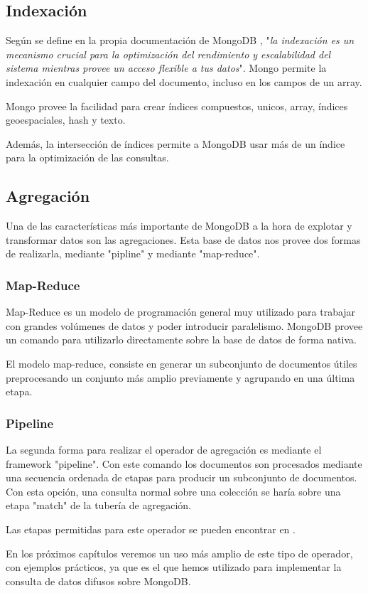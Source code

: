 \subsection{Indexación}

Según se define en la propia documentación de MongoDB \cite{mongodb}, "\textit{la indexación es un mecanismo crucial para la optimización del rendimiento y escalabilidad del sistema mientras provee un acceso flexible a tus datos}". Mongo permite la indexación en cualquier campo del documento, incluso en los campos de un array.

Mongo provee la facilidad para crear índices compuestos, unicos, array, índices geoespaciales, hash y texto.

Además, la intersección de índices permite a MongoDB usar más de un índice para la optimización de las consultas.

\subsection{Agregación}

Una de las características más importante de MongoDB a la hora de explotar y transformar datos son las agregaciones. Esta base de datos nos provee dos formas de realizarla, mediante "pipline" y mediante "map-reduce".

\subsubsection{Map-Reduce}

Map-Reduce es un modelo de programación general muy utilizado para trabajar con grandes volúmenes de datos y poder introducir paralelismo. MongoDB provee un comando para utilizarlo directamente sobre la base de datos de forma nativa.

El modelo map-reduce, consiste en generar un subconjunto de documentos útiles preprocesando un conjunto más amplio previamente y agrupando en una última etapa.

\subsubsection{Pipeline}

La segunda forma para realizar el operador de agregación es mediante el framework "pipeline". Con este comando los documentos son procesados mediante una secuencia ordenada de etapas para producir un subconjunto de documentos. Con esta opción, una consulta normal sobre una colección se haría sobre una etapa "match" de la tubería de agregación.

Las etapas permitidas para este operador se pueden encontrar en \cite{aggregationstages}.

En los próximos capítulos veremos un uso más amplio de este tipo de operador, con ejemplos prácticos, ya que es el que hemos utilizado para implementar la consulta de datos difusos sobre MongoDB.
